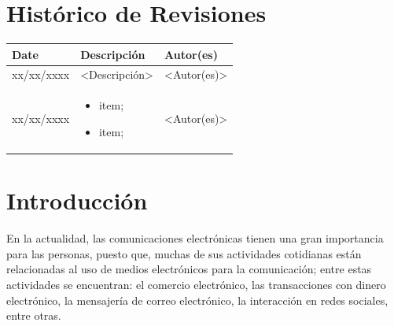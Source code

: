 \documentclass[a4paper]{article}
\begin{document}

\capa
\newpage

\section*{\center Histórico de Revisiones}
  \vspace*{1cm}
  \begin{table}[ht]
    \centering
    \begin{tabular}[pos]{|m{2cm} | m{7.2cm} | m{3.8cm}|} 
      \hline
      \cellcolor[gray]{0.9}
      \textbf{Date} & \cellcolor[gray]{0.9}\textbf{Descripción} & \cellcolor[gray]{0.9}\textbf{Autor(es)}\\ \hline
      \hline
      \small xx/xx/xxxx & \small <Descripción> & \small <Autor(es)> \\ \hline      
      \small xx/xx/xxxx &
      \begin{small}
        \begin{itemize}
          \item item;
          \item item;
        \end{itemize}
      \end{small} & \small <Autor(es)> \\ \hline 
    \end{tabular}
  \end{table}

\newpage

\tableofcontents
\newpage

\section{Introducción}

En la actualidad, las comunicaciones electrónicas tienen una gran importancia para las personas, puesto que, muchas de sus actividades cotidianas están relacionadas al uso de medios electrónicos para la comunicación; entre estas actividades se encuentran: el comercio electrónico, las transacciones con dinero electrónico, la mensajería de correo electrónico, la interacción en redes sociales, entre otras.
\end{document}
